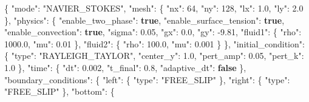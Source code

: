 \documentclass[
  10pt,
]{article}
\newenvironment{Shaded}{}{}
\newcommand{\DataTypeTok}[1]{\textcolor[rgb]{0.56,0.13,0.00}{#1}}
\newcommand{\DecValTok}[1]{\textcolor[rgb]{0.25,0.63,0.44}{#1}}
\newcommand{\FloatTok}[1]{\textcolor[rgb]{0.25,0.63,0.44}{#1}}
\newcommand{\FunctionTok}[1]{\textcolor[rgb]{0.02,0.16,0.49}{#1}}
\newcommand{\KeywordTok}[1]{\textcolor[rgb]{0.00,0.44,0.13}{\textbf{#1}}}
\newcommand{\StringTok}[1]{\textcolor[rgb]{0.25,0.44,0.63}{#1}}
\begin{document}
\begin{Shaded}
\begin{Highlighting}[]
\FunctionTok{\{}
  \DataTypeTok{"mode"}\FunctionTok{:} \StringTok{"NAVIER\_STOKES"}\FunctionTok{,}
  \DataTypeTok{"mesh"}\FunctionTok{:} \FunctionTok{\{}
    \DataTypeTok{"nx"}\FunctionTok{:} \DecValTok{64}\FunctionTok{,}
    \DataTypeTok{"ny"}\FunctionTok{:} \DecValTok{128}\FunctionTok{,}
    \DataTypeTok{"lx"}\FunctionTok{:} \FloatTok{1.0}\FunctionTok{,}
    \DataTypeTok{"ly"}\FunctionTok{:} \FloatTok{2.0}
  \FunctionTok{\},}
  \DataTypeTok{"physics"}\FunctionTok{:} \FunctionTok{\{}
    \DataTypeTok{"enable\_two\_phase"}\FunctionTok{:} \KeywordTok{true}\FunctionTok{,}
    \DataTypeTok{"enable\_surface\_tension"}\FunctionTok{:} \KeywordTok{true}\FunctionTok{,}
    \DataTypeTok{"enable\_convection"}\FunctionTok{:} \KeywordTok{true}\FunctionTok{,}
    \DataTypeTok{"sigma"}\FunctionTok{:} \FloatTok{0.05}\FunctionTok{,}
    \DataTypeTok{"gx"}\FunctionTok{:} \FloatTok{0.0}\FunctionTok{,}
    \DataTypeTok{"gy"}\FunctionTok{:} \FloatTok{{-}9.81}\FunctionTok{,}
    \DataTypeTok{"fluid1"}\FunctionTok{:} \FunctionTok{\{}
      \DataTypeTok{"rho"}\FunctionTok{:} \FloatTok{1000.0}\FunctionTok{,}
      \DataTypeTok{"mu"}\FunctionTok{:} \FloatTok{0.01}
    \FunctionTok{\},}
    \DataTypeTok{"fluid2"}\FunctionTok{:} \FunctionTok{\{}
      \DataTypeTok{"rho"}\FunctionTok{:} \FloatTok{100.0}\FunctionTok{,}
      \DataTypeTok{"mu"}\FunctionTok{:} \FloatTok{0.001}
    \FunctionTok{\}}
  \FunctionTok{\},}
  \DataTypeTok{"initial\_condition"}\FunctionTok{:} \FunctionTok{\{}
    \DataTypeTok{"type"}\FunctionTok{:} \StringTok{"RAYLEIGH\_TAYLOR"}\FunctionTok{,}
    \DataTypeTok{"center\_y"}\FunctionTok{:} \FloatTok{1.0}\FunctionTok{,}
    \DataTypeTok{"pert\_amp"}\FunctionTok{:} \FloatTok{0.05}\FunctionTok{,}
    \DataTypeTok{"pert\_k"}\FunctionTok{:} \FloatTok{1.0}
  \FunctionTok{\},}
  \DataTypeTok{"time"}\FunctionTok{:} \FunctionTok{\{}
    \DataTypeTok{"dt"}\FunctionTok{:} \FloatTok{0.002}\FunctionTok{,}
    \DataTypeTok{"t\_final"}\FunctionTok{:} \FloatTok{0.8}\FunctionTok{,}
    \DataTypeTok{"adaptive\_dt"}\FunctionTok{:} \KeywordTok{false}
  \FunctionTok{\},}
  \DataTypeTok{"boundary\_conditions"}\FunctionTok{:} \FunctionTok{\{}
    \DataTypeTok{"left"}\FunctionTok{:} \FunctionTok{\{}
      \DataTypeTok{"type"}\FunctionTok{:} \StringTok{"FREE\_SLIP"}
    \FunctionTok{\},}
    \DataTypeTok{"right"}\FunctionTok{:} \FunctionTok{\{}
      \DataTypeTok{"type"}\FunctionTok{:} \StringTok{"FREE\_SLIP"}
    \FunctionTok{\},}
    \DataTypeTok{"bottom"}\FunctionTok{:} \FunctionTok{\{}

\end{Highlighting}
\end{Shaded}
\end{document}
